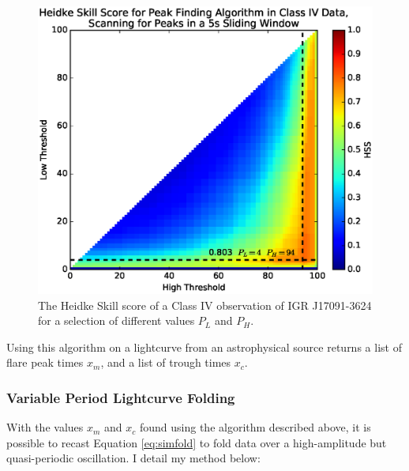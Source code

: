 \begin{figure}
    \includegraphics[width=\columnwidth, trim = 0mm 10mm 0mm 10mm]{images/HSS_J.eps}
    \captionsetup{singlelinecheck=off}
    \caption{The Heidke Skill score of a Class IV observation of IGR J17091-3624 for a selection of different values $P_L$ and $P_H$.}
   \label{fig:Heidke}
\end{figure}

\par Using this algorithm on a lightcurve from an astrophysical source returns a list of flare peak times $x_m$, and a list of trough times $x_c$.

\subsubsection{Variable Period Lightcurve Folding}

\par With the values $x_m$ and $x_c$ found using the algorithm described above, it is possible to recast Equation \ref{eq:simfold} to fold data over a high-amplitude but quasi-periodic oscillation.  I detail my method below:

